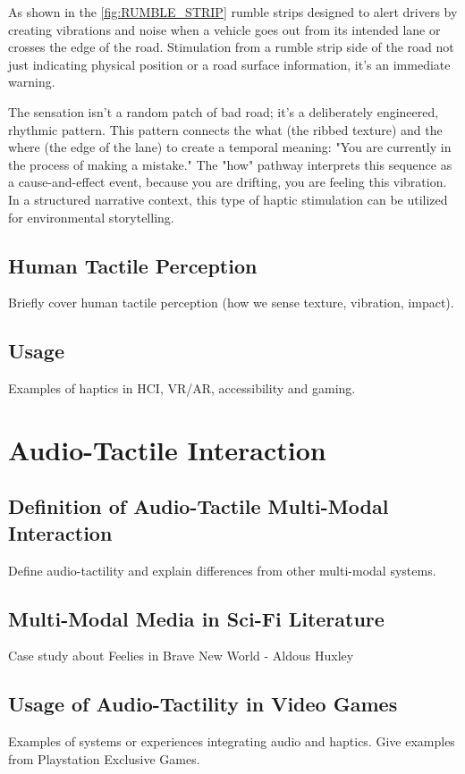             As shown in the \ref{fig:RUMBLE_STRIP} rumble strips designed to alert drivers by creating vibrations and noise when a vehicle goes out from its intended lane or crosses the edge of the road. Stimulation from a rumble strip side of the road not just indicating physical position or a road surface information, it's an immediate warning.\par

            The sensation isn't a random patch of bad road; it's a deliberately engineered, rhythmic pattern. This pattern connects the what (the ribbed texture) and the where (the edge of the lane) to create a temporal meaning: "You are currently in the process of making a mistake." The "how" pathway interprets this sequence as a cause-and-effect event, because you are drifting, you are feeling this vibration. In a structured narrative context, this type of haptic stimulation can be utilized for environmental storytelling.\par

        \subsection{Human Tactile Perception} Briefly cover human tactile perception (how we sense texture, vibration, impact).
        \subsection{Usage} Examples of haptics in HCI, VR/AR, accessibility and gaming.
    \section{Audio-Tactile Interaction}
        \subsection{Definition of Audio-Tactile Multi-Modal Interaction} Define audio-tactility and explain differences from other multi-modal systems.
        \subsection{Multi-Modal Media in Sci-Fi Literature} Case study about Feelies in Brave New World - Aldous Huxley 
        \subsection{Usage of Audio-Tactility in Video Games} Examples of systems or experiences integrating audio and haptics. Give examples from Playstation Exclusive Games.